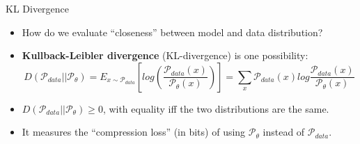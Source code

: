 \begin{frame}[allowframebreaks]{KL Divergence}
    \begin{itemize}
        \item How do we evaluate ``closeness'' between model and data distribution?
        \item \textbf{Kullback-Leibler divergence} (KL-divergence) is one possibility:
        $$D(\mathcal{P}_{data}||\mathcal{P}_{\theta}) = E_{x \sim \mathcal{P}_{data}}   \left [log \left ( \frac{\mathcal{P}_{data}(x)}{\mathcal{P}_{\theta}(x)} \right ) \right ] = \sum_{x} \mathcal{P}_{data}(x) log \frac{\mathcal{P}_{data}(x)}{\mathcal{P}_{\theta}(x)}$$
        \item $D(\mathcal{P}_{data}||\mathcal{P}_{\theta}) \geq 0$, with equality iff the two distributions are the same.
        \item It measures the ``compression loss'' (in bits) of using $\mathcal{P}_{\theta}$ instead of $\mathcal{P}_{data}$.
    \end{itemize}
\end{frame}

